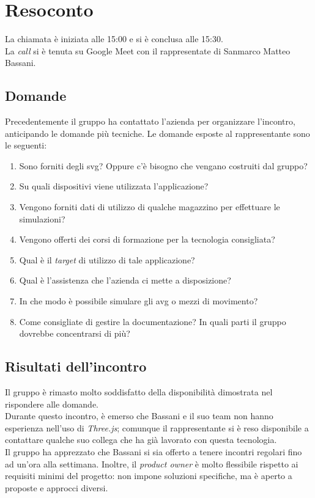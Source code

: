 \section{Resoconto}
La chiamata è iniziata alle 15:00 e si è conclusa alle 15:30. \\
La \textit{call} si è tenuta su Google Meet con il rappresentate di Sanmarco 
Matteo Bassani.
\subsection{Domande}
Precedentemente il gruppo ha contattato l'azienda per organizzare l'incontro, 
anticipando le domande più tecniche.
Le domande esposte al rappresentante sono le seguenti:

\begin{enumerate}
    \item Sono forniti degli svg? Oppure c'è bisogno che vengano costruiti dal 
		gruppo?
    \item Su quali dispositivi viene utilizzata l'applicazione?
    \item Vengono forniti dati di utilizzo di qualche magazzino per effettuare 
		le simulazioni?
    \item Vengono offerti dei corsi di formazione per la tecnologia consigliata?
	\item Qual è il \textit{target} di utilizzo di tale applicazione?
    \item Qual è l'assistenza che l'azienda ci mette a disposizione?
    \item In che modo è possibile simulare gli avg o mezzi di movimento?
    \item Come consigliate di gestire la documentazione? In quali parti il 
		gruppo dovrebbe concentrarsi di più?
\end{enumerate}

\subsection{Risultati dell'incontro}
Il gruppo è rimasto molto soddisfatto della disponibilità dimostrata nel 
rispondere alle domande. \\ 
Durante questo incontro, è emerso che Bassani e il suo team non hanno 
esperienza nell'uso di \textit{Three.js}; comunque il rappresentante si è reso 
disponibile
a contattare qualche suo collega che ha già lavorato con questa tecnologia. \\
Il gruppo ha apprezzato che Bassani si sia offerto a tenere incontri 
regolari fino ad un'ora alla settimana. Inoltre, il \textit{product owner} è
molto flessibile rispetto ai requisiti minimi del progetto: non impone soluzioni
specifiche, ma è aperto a proposte e approcci diversi. \\

